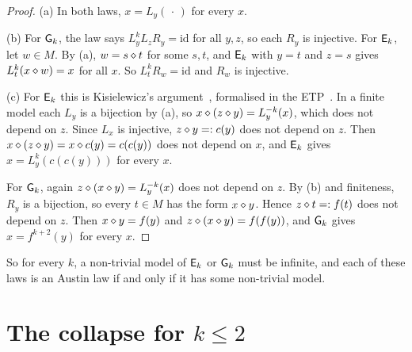 \begin{proof}
(a) In both laws, $x=L_y(\,\cdot\,)$ for every $x$.

(b) For $\mathsf{G}_{k}$, the law says $L_y^kL_zR_y=\mathrm{id}$ for all $y,z$, so each
$R_y$ is injective. For $\mathsf{E}_{k}$, let $w\in M$. By (a), $w=s\mathbin{\diamond} t$ for some
$s,t$, and $\mathsf{E}_{k}$ with $y=t$ and $z=s$ gives $L_t^{k}(x\mathbin{\diamond} w)=x$ for all $x$.
So $L_t^kR_w=\mathrm{id}$ and $R_w$ is injective.

(c) For $\mathsf{E}_{k}$ this is Kisielewicz's argument~\cite{Kisielewicz1997},
formalised in the ETP~\cite{ETPblueprint}. In a finite model each $L_y$ is a
bijection by (a), so $x\mathbin{\diamond}(z\mathbin{\diamond} y)=L_y^{-k}(x)$, which does not depend on $z$.
Since $L_x$ is injective, $z\mathbin{\diamond} y=:c(y)$ does not depend on $z$. Then
$x\mathbin{\diamond}(z\mathbin{\diamond} y)=x\mathbin{\diamond} c(y)=c(c(y))$ does not depend on $x$, and $\mathsf{E}_{k}$ gives
$x=L_y^k(c(c(y)))$ for every $x$.

For $\mathsf{G}_{k}$, again $z\mathbin{\diamond}(x\mathbin{\diamond} y)=L_y^{-k}(x)$ does not depend on $z$. By (b)
and finiteness, $R_y$ is a bijection, so every $t\in M$ has the form $x\mathbin{\diamond} y$.
Hence $z\mathbin{\diamond} t=:f(t)$ does not depend on $z$. Then $x\mathbin{\diamond} y=f(y)$ and
$z\mathbin{\diamond}(x\mathbin{\diamond} y)=f(f(y))$, and $\mathsf{G}_{k}$ gives $x=f^{k+2}(y)$ for every $x$.
\end{proof}

So for every $k$, a non-trivial model of $\mathsf{E}_{k}$ or $\mathsf{G}_{k}$ must be infinite,
and each of these laws is an Austin law if and only if it has some non-trivial
model.

\section{The collapse for \texorpdfstring{$k\le2$}{k<=2}}\label{sec:collapse}

